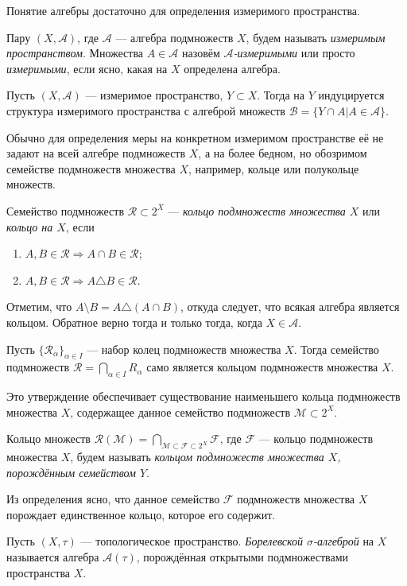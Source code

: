 Понятие алгебры достаточно для определения измеримого пространства.
\begin{defin}
	Пару $(X,\mathcal{A})$, где $\mathcal{A}$ --- алгебра подмножеств $X$, будем называть \textit{измеримым пространством}. Множества $A\in\mathcal{A}$ назовём \textit{$\mathcal{A}$-измеримыми} или просто \textit{измеримыми}, если ясно, какая на $X$ определена алгебра.
\end{defin}
\begin{defin}
	Пусть $(X,\mathcal{A})$ --- измеримое пространство, $Y\subset X$. Тогда на $Y$ индуцируется структура измеримого пространства с алгеброй множеств $\mathcal{B}=\{Y\cap A|A\in\mathcal{A}\}$.
\end{defin}

Обычно для определения меры на конкретном измеримом пространстве её не задают на всей алгебре подмножеств $X$, а на более бедном, но обозримом семействе подмножеств множества $X$, например, кольце или полукольце множеств.
\begin{defin}
	Семейство подмножеств $\mathcal{R}\subset 2^X$ --- \textit{кольцо подмножеств множества $X$} или \textit{кольцо на $X$}, если
	\begin{enumerate}
		\item $A,B\in\mathcal{R}\Rightarrow A\cap B\in\mathcal{R}$;
		\item $A,B\in\mathcal{R}\Rightarrow A\triangle B\in\mathcal{R}$.
	\end{enumerate}
\end{defin}
Отметим, что $A\setminus B=A\triangle(A\cap B)$, откуда следует, что всякая алгебра является кольцом. Обратное верно тогда и только тогда, когда $X\in\mathcal{A}$.

\begin{prop}
	Пусть $\{\mathcal{R}_{\alpha}\}_{\alpha\in I}$ --- набор колец подмножеств множества $X$. Тогда семейство подмножеств $\mathcal{R}=\bigcap\limits_{\alpha\in I} R_{\alpha}$ само является кольцом подмножеств множества $X$.
\end{prop}
Это утверждение обеспечивает существование наименьшего кольца подмножеств множества $X$, содержащее данное семейство подмножеств $\mathcal{M}\subset 2^X$.
\begin{defin}
	Кольцо множеств $\mathcal{R}(\mathcal{M})=\bigcap\limits_{\mathcal{M}\subset\mathcal{F}\subset 2^X} \mathcal{F}$, где $\mathcal{F}$ --- кольцо подмножеств множества $X$, будем называть \textit{кольцом подмножеств множества $X$, порождённым семейством $Y$}. 
\end{defin}
Из определения ясно, что данное семейство $\mathcal{F}$ подмножеств множества $X$ порождает единственное кольцо, которое его содержит.
\begin{defin}
	Пусть $(X,\tau)$ --- топологическое пространство. \textit{Борелевской $\sigma$-алгеброй} на $X$ называется алгебра $\mathcal{A}(\tau)$, порождённая открытыми подмножествами пространства $X$.
\end{defin}

